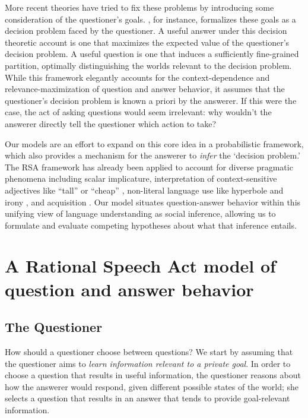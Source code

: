 \documentclass[12pt, floatsintext, jou]{apa6}
\begin{document}
More recent theories have tried to fix these problems by introducing some consideration of the questioner's goals. , for instance, formalizes these goals as a decision problem faced by the questioner. A useful answer under this decision theoretic account is one that maximizes the expected value of the questioner's decision problem. A useful question is one that induces a sufficiently fine-grained partition, optimally distinguishing the worlds relevant to the decision problem. While this framework elegantly accounts for the context-dependence and relevance-maximization of question and answer behavior, it assumes that the questioner's decision problem is known a priori by the answerer.  If this were the case, the act of asking questions would seem irrelevant: why wouldn't the answerer directly tell the questioner which action to take?

Our models are an effort to expand on this core idea in a probabilistic framework, which also provides a mechanism for the answerer to \emph{infer} the `decision problem.' 
The RSA framework has already been applied to account for diverse pragmatic phenomena including scalar implicature\cite{GoodmanStuhlmuller13_KnowledgeImplicature}, 
interpretation of context-sensitive adjectives like ``tall'' or ``cheap'' \cite{LassiterGoodman15_AdjectivalVagueness}, 
non-literal language use like hyperbole \cite{KaoWuBergenGoodman14_NonliteralNumberWords} and irony \cite{KaoGoodman15_IronyCogSci}, 
and acquisition \cite{FrankGoodman14_InferringWordMeanings}. 
Our model situates question-answer behavior within this unifying view of language understanding as social inference, allowing us to formulate and evaluate competing hypotheses about what that inference entails. 


\section{A Rational Speech Act model of question and answer behavior}
\label{sec:model}

\subsection{The Questioner}

How should a questioner choose between questions?
%
We start by assuming that the questioner aims to \emph{learn information relevant to a private goal}.
%
In order to choose a question that results in useful information, the questioner reasons about how the answerer would respond, given different possible states of the world; she selects a question that results in an answer that tends to provide goal-relevant information.
%
\end{document}
